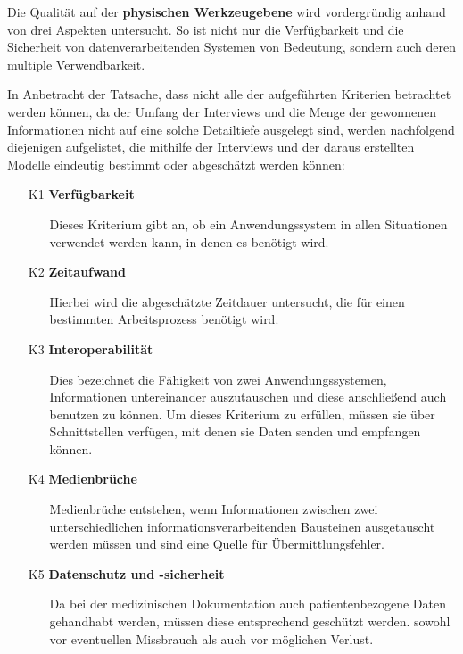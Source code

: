 Die Qualität auf der \textbf{physischen Werkzeugebene} wird vordergründig anhand von drei Aspekten untersucht. So ist nicht nur die Verfügbarkeit und die Sicherheit von datenverarbeitenden Systemen von Bedeutung, sondern auch deren multiple Verwendbarkeit.

In Anbetracht der Tatsache, dass nicht alle der aufgeführten Kriterien betrachtet werden können, da der Umfang der Interviews und die Menge der gewonnenen Informationen nicht auf eine solche Detailtiefe ausgelegt sind, werden nachfolgend diejenigen aufgelistet, die mithilfe der Interviews und der daraus erstellten Modelle eindeutig bestimmt oder abgeschätzt werden können:

\begin{itemize}
	\item[K1] \textbf{Verfügbarkeit}
	\begin{itemize}
		\item[] Dieses Kriterium gibt an, ob ein Anwendungssystem in allen Situationen verwendet werden kann, in denen es benötigt wird.
	\end{itemize}
	\item[K2] \textbf{Zeitaufwand}
	\begin{itemize}
		\item[] Hierbei wird die abgeschätzte Zeitdauer untersucht, die für einen bestimmten Arbeitsprozess benötigt wird.
	\end{itemize}
	\item[K3] \textbf{Interoperabilität}
	\begin{itemize}
		\item[] Dies bezeichnet die Fähigkeit von zwei Anwendungssystemen, Informationen untereinander auszutauschen und diese anschließend auch benutzen zu können. Um dieses Kriterium zu erfüllen, müssen sie über Schnittstellen verfügen, mit denen sie Daten senden und empfangen können.
	\end{itemize}
	\item[K4] \textbf{Medienbrüche}
	\begin{itemize}
		\item[] Medienbrüche entstehen, wenn Informationen zwischen zwei unterschiedlichen informationsverarbeitenden Bausteinen ausgetauscht werden müssen und sind eine Quelle für Übermittlungsfehler.
	\end{itemize}
	\item[K5] \textbf{Datenschutz und -sicherheit}
	\begin{itemize}
		\item[] Da bei der medizinischen Dokumentation auch patientenbezogene Daten gehandhabt werden, müssen diese entsprechend geschützt werden. sowohl vor eventuellen Missbrauch als auch vor möglichen Verlust.
	\end{itemize}
\end{itemize}